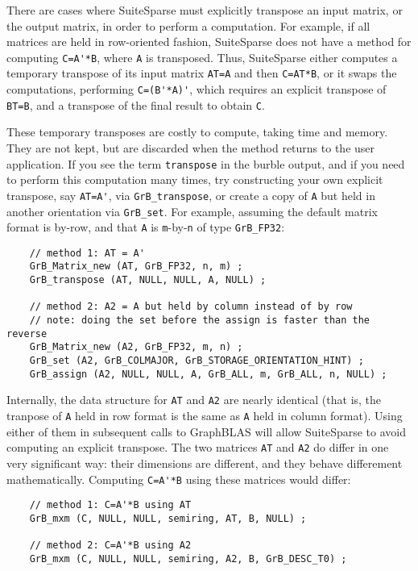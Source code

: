 \documentclass[12pt]{article}
\begin{document}
There are cases where SuiteSparse must explicitly transpose an input matrix, or
the output matrix, in order to perform a computation.  For example, if all
matrices are held in row-oriented fashion, SuiteSparse does not have a method
for computing \verb"C=A'*B", where \verb'A' is transposed.  Thus, SuiteSparse
either computes a temporary transpose of its input matrix \verb'AT=A' and then
\verb'C=AT*B', or it swaps the computations, performing \verb"C=(B'*A)'", which
requires an explicit transpose of \verb'BT=B', and a transpose of the final
result to obtain \verb'C'.

These temporary transposes are costly to compute, taking time and memory.  They
are not kept, but are discarded when the method returns to the user
application.  If you see the term \verb'transpose' in the burble output, and if
you need to perform this computation many times, try constructing your own
explicit transpose, say \verb"AT=A'", via \verb'GrB_transpose', or create a
copy of \verb'A' but held in another orientation via \verb'GrB_set'.  For
example, assuming the default matrix format is by-row, and that \verb'A' is
\verb'm'-by-\verb'n' of type \verb'GrB_FP32':

    {\footnotesize
    \begin{verbatim}
    // method 1: AT = A'
    GrB_Matrix_new (AT, GrB_FP32, n, m) ;
    GrB_transpose (AT, NULL, NULL, A, NULL) ;

    // method 2: A2 = A but held by column instead of by row
    // note: doing the set before the assign is faster than the reverse
    GrB_Matrix_new (A2, GrB_FP32, m, n) ;
    GrB_set (A2, GrB_COLMAJOR, GrB_STORAGE_ORIENTATION_HINT) ;
    GrB_assign (A2, NULL, NULL, A, GrB_ALL, m, GrB_ALL, n, NULL) ; \end{verbatim}}

Internally, the data structure for \verb'AT' and \verb'A2' are nearly identical
(that is, the tranpose of \verb'A' held in row format is the same as \verb'A'
held in column format).  Using either of them in subsequent calls to GraphBLAS
will allow SuiteSparse to avoid computing an explicit transpose.  The two
matrices \verb'AT' and \verb'A2' do differ in one very significant way:  their
dimensions are different, and they behave differement mathematically.
Computing \verb"C=A'*B" using these matrices would differ:

    {\footnotesize
    \begin{verbatim}
    // method 1: C=A'*B using AT
    GrB_mxm (C, NULL, NULL, semiring, AT, B, NULL) ;

    // method 2: C=A'*B using A2
    GrB_mxm (C, NULL, NULL, semiring, A2, B, GrB_DESC_T0) ; \end{verbatim}}
\end{document}
